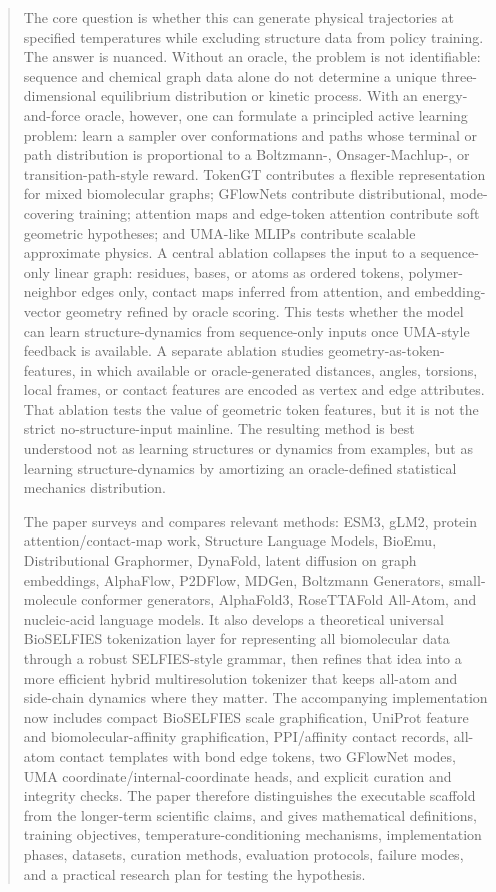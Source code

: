 \documentclass[11pt]{article}
\begin{document}
\begin{abstract}
The core question is whether this can generate physical trajectories at specified temperatures while excluding structure data from policy training. The answer is nuanced. Without an oracle, the problem is not identifiable: sequence and chemical graph data alone do not determine a unique three-dimensional equilibrium distribution or kinetic process. With an energy-and-force oracle, however, one can formulate a principled active learning problem: learn a sampler over conformations and paths whose terminal or path distribution is proportional to a Boltzmann-, Onsager-Machlup-, or transition-path-style reward. TokenGT contributes a flexible representation for mixed biomolecular graphs; GFlowNets contribute distributional, mode-covering training; attention maps and edge-token attention contribute soft geometric hypotheses; and UMA-like MLIPs contribute scalable approximate physics. A central ablation collapses the input to a sequence-only linear graph: residues, bases, or atoms as ordered tokens, polymer-neighbor edges only, contact maps inferred from attention, and embedding-vector geometry refined by oracle scoring. This tests whether the model can learn structure-dynamics from sequence-only inputs once UMA-style feedback is available. A separate ablation studies geometry-as-token-features, in which available or oracle-generated distances, angles, torsions, local frames, or contact features are encoded as vertex and edge attributes. That ablation tests the value of geometric token features, but it is not the strict no-structure-input mainline. The resulting method is best understood not as learning structures or dynamics from examples, but as learning structure-dynamics by amortizing an oracle-defined statistical mechanics distribution.

The paper surveys and compares relevant methods: ESM3, gLM2, protein attention/contact-map work, Structure Language Models, BioEmu, Distributional Graphormer, DynaFold, latent diffusion on graph embeddings, AlphaFlow, P2DFlow, MDGen, Boltzmann Generators, small-molecule conformer generators, AlphaFold3, RoseTTAFold All-Atom, and nucleic-acid language models. It also develops a theoretical universal BioSELFIES tokenization layer for representing all biomolecular data through a robust SELFIES-style grammar, then refines that idea into a more efficient hybrid multiresolution tokenizer that keeps all-atom and side-chain dynamics where they matter. The accompanying implementation now includes compact BioSELFIES scale graphification, UniProt feature and biomolecular-affinity graphification, PPI/affinity contact records, all-atom contact templates with bond edge tokens, two GFlowNet modes, UMA coordinate/internal-coordinate heads, and explicit curation and integrity checks. The paper therefore distinguishes the executable scaffold from the longer-term scientific claims, and gives mathematical definitions, training objectives, temperature-conditioning mechanisms, implementation phases, datasets, curation methods, evaluation protocols, failure modes, and a practical research plan for testing the hypothesis.
\end{abstract}
\end{document}
